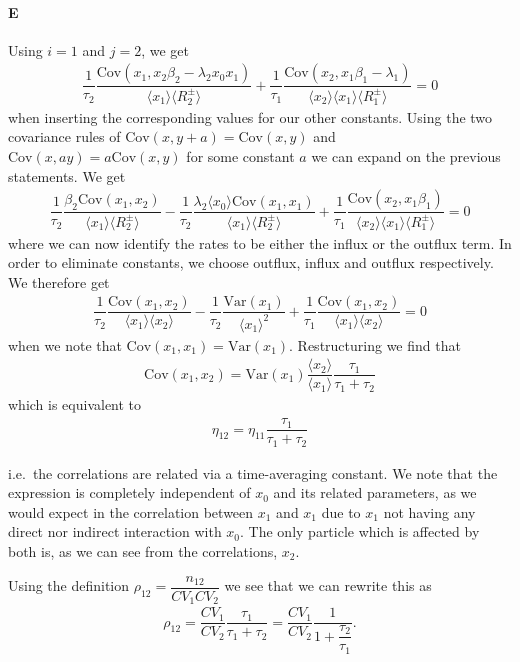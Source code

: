 \documentclass[10pt]{article}\usepackage[]{graphicx}\usepackage[]{color}
\newcommand{\avg}[1]{\ensuremath{\langle {#1} \rangle}} %
\theoremstyle{plain}
\newcommand{\Var}{\ensuremath{\mathrm{Var}}}
\newcommand{\Cov}{\ensuremath{\mathrm{Cov}}}
\begin{document}
  \paragraph*{E}
  Using $i = 1$ and $j = 2$, we get
  \begin{align*}
    \dfrac{1}{\tau_2}\dfrac{\Cov(x_1, x_2\beta_2 - \lambda_2x_0 x_1)}{\avg{x_1}\avg{R_2^\pm}} + 
    \dfrac{1}{\tau_1}\dfrac{\Cov(x_2, x_1\beta_1 - \lambda_1)}{\avg{x_2}\avg{x_1}\avg{R_1^\pm}} = 0
  \end{align*}
  when inserting the corresponding values for our other constants. Using the two covariance rules of $\Cov(x, y + a) = \Cov(x,y)$ and $\Cov(x,ay) = a\Cov(x,y)$ for some constant $a$ we can expand on the previous statements. We get
  \begin{align*}
    \dfrac{1}{\tau_2}\dfrac{\beta_2\Cov(x_1, x_2)}{\avg{x_1}\avg{R_2^\pm}} - 
    \dfrac{1}{\tau_2}\dfrac{\lambda_2 \avg{x_0} \Cov(x_1,x_1)}{\avg{x_1}\avg{R_2^\pm}} + 
    \dfrac{1}{\tau_1}\dfrac{\Cov(x_2, x_1\beta_1)}{\avg{x_2}\avg{x_1}\avg{R_1^\pm}} = 0
  \end{align*}
  where we can now identify the rates to be either the influx or the outflux term. In order to eliminate constants, we choose outflux, influx and outflux respectively. We therefore get
  \begin{align*}
    \dfrac{1}{\tau_2}\dfrac{\Cov(x_1, x_2)}{\avg{x_1}\avg{x_2}} - 
    \dfrac{1}{\tau_2}\dfrac{\Var(x_1)}{\avg{x_1}^2} +
    \dfrac{1}{\tau_1}\dfrac{\Cov(x_1, x_2)}{\avg{x_1}\avg{x_2}} = 0 
  \end{align*}
  when we note that $\Cov(x_1,x_1) = \Var(x_1)$. Restructuring we find that 
  \begin{align*}
    \Cov(x_1,x_2) = \Var(x_1)\dfrac{\avg{x_2}}{\avg{x_1}}\dfrac{\tau_1}{\tau_1 + \tau_2}
  \end{align*}
  which is equivalent to 
  \begin{align*}
    \eta_{12} = \eta_{11}\dfrac{\tau_1}{\tau_1 + \tau_2}
  \end{align*}
  
  i.e.\ the correlations are related via a time-averaging constant. We note that the expression is completely independent of $x_0$ and its related parameters, as we would expect in the correlation between $x_1$ and $x_1$ due to $x_1$ not having any direct nor indirect interaction with $x_0$. The only particle which is affected by both is, as we can see from the correlations, $x_2$.
  
  Using the definition $\rho_{12} = \dfrac{n_{12}}{CV_1 CV_2}$ we see that we can rewrite this as
  \begin{align*}
    \rho_{12} = \dfrac{CV_1}{CV_2}\dfrac{\tau_1}{\tau_1 + \tau_2} = \dfrac{CV_1}{CV_2}\dfrac{1}{1 + \dfrac{\tau_2}{\tau_1}}.
  \end{align*}
  
\end{document}
